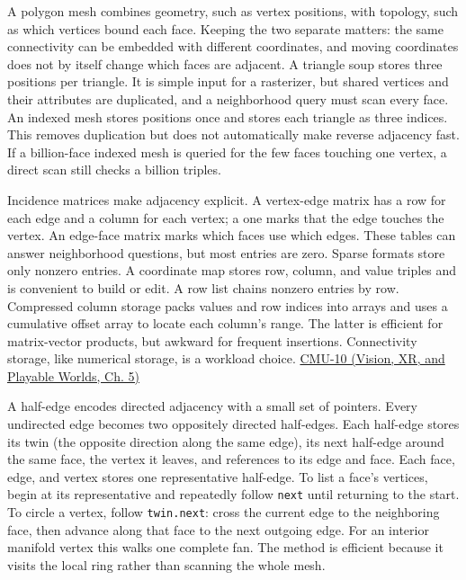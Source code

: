 A polygon mesh combines geometry, such as vertex positions, with topology, such as which vertices bound each face. Keeping the two separate matters: the same connectivity can be embedded with different coordinates, and moving coordinates does not by itself change which faces are adjacent. A triangle soup stores three positions per triangle. It is simple input for a rasterizer, but shared vertices and their attributes are duplicated, and a neighborhood query must scan every face. An indexed mesh stores positions once and stores each triangle as three indices. This removes duplication but does not automatically make reverse adjacency fast. If a billion-face indexed mesh is queried for the few faces touching one vertex, a direct scan still checks a billion triples.

Incidence matrices make adjacency explicit. A vertex-edge matrix has a row for each edge and a column for each vertex; a one marks that the edge touches the vertex. An edge-face matrix marks which faces use which edges. These tables can answer neighborhood questions, but most entries are zero. Sparse formats store only nonzero entries. A coordinate map stores row, column, and value triples and is convenient to build or edit. A row list chains nonzero entries by row. Compressed column storage packs values and row indices into arrays and uses a cumulative offset array to locate each column's range. The latter is efficient for matrix-vector products, but awkward for frequent insertions. Connectivity storage, like numerical storage, is a workload choice. \href{../07-Vision-XR-and-Playable-Worlds/main.pdf\#nameddest=04-visual-computing-ii-ch036-cmu-10---meshes-and-manifolds}{CMU-10 (Vision, XR, and Playable Worlds, Ch. 5)}

A half-edge encodes directed adjacency with a small set of pointers. Every undirected edge becomes two oppositely directed half-edges. Each half-edge stores its twin (the opposite direction along the same edge), its next half-edge around the same face, the vertex it leaves, and references to its edge and face. Each face, edge, and vertex stores one representative half-edge. To list a face's vertices, begin at its representative and repeatedly follow \texttt{next} until returning to the start. To circle a vertex, follow \texttt{twin.next}: cross the current edge to the neighboring face, then advance along that face to the next outgoing edge. For an interior manifold vertex this walks one complete fan. The method is efficient because it visits the local ring rather than scanning the whole mesh.

